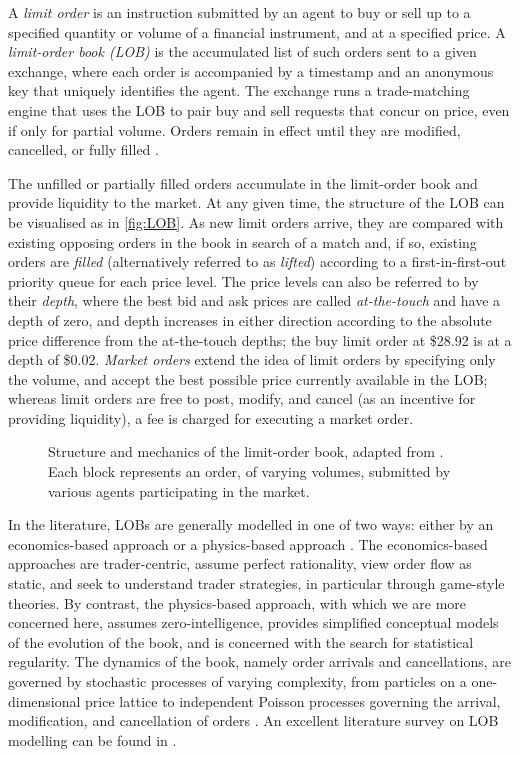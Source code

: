 A \emph{limit order} is an instruction submitted by an agent to buy or sell up to a specified quantity or volume of a financial instrument, and at a specified price. A \emph{limit-order book (LOB)} is the accumulated list of such orders sent to a given exchange, where each order is accompanied by a timestamp and an anonymous key that uniquely identifies the agent. The exchange runs a trade-matching engine that uses the LOB to pair buy and sell requests that concur on price, even if only for partial volume. Orders remain in effect until they are modified, cancelled, or fully filled \citep{Kyle1989}.

The unfilled or partially filled orders accumulate in the limit-order book and provide liquidity to the market. At any given time, the structure of the LOB can be visualised as in \autoref{fig:LOB}. As new limit orders arrive, they are compared with existing opposing orders in the book in search of a match and, if so, existing orders are \emph{filled} (alternatively referred to as \emph{lifted}) according to a first-in-first-out priority queue for each price level. The price levels can also be referred to by their \emph{depth}, where the best bid and ask prices are called \emph{at-the-touch} and have a depth of zero, and depth increases in either direction according to the absolute price difference from the at-the-touch depths; the buy limit order at \$28.92 is at a depth of \$0.02. \emph{Market orders} extend the idea of limit orders by specifying only the volume, and accept the best possible price currently available in the LOB; whereas limit orders are free to post, modify, and cancel (as an incentive for providing liquidity), a fee is charged for executing a market order.

\begin{figure}
  
\caption[Structure and mechanics of the limit-order book]{Structure and mechanics of the limit-order book, adapted from \citet{Booth15}. Each block represents an order, of varying volumes, submitted by various agents participating in the market.}
\label{fig:LOB}
\end{figure}

In the literature, LOBs are generally modelled in one of two ways: either by an economics-based approach or a physics-based approach \citep{Summary2013}. The economics-based approaches are trader-centric, assume perfect rationality, view order flow as static, and seek to understand trader strategies, in particular through game-style theories. By contrast, the physics-based approach, with which we are more concerned here, assumes zero-intelligence, provides simplified conceptual models of the evolution of the book, and is concerned with the search for statistical regularity. The dynamics of the book, namely order arrivals and cancellations, are governed by stochastic processes of varying complexity, from particles on a one-dimensional price lattice \citep{Bak97} to independent Poisson processes governing the arrival, modification, and cancellation of orders \citep{Cont10}. An excellent literature survey on LOB modelling can be found in \citet{Summary2013}.

